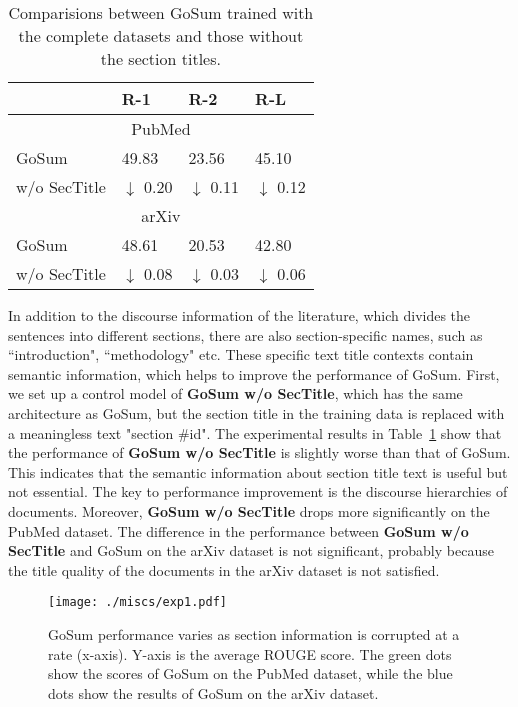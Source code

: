 \begin{table}[t]
  \centering
  \begin{tabular}{l|p{13mm}p{13mm}p{13mm}}\toprule
                    & \hfil R-1  & \hfil R-2  & \hfil R-L    \\ \midrule
                    \multicolumn{4}{c}{PubMed}     \\ \midrule
        GoSum                       & \hfil 49.83 & \hfil 23.56 & \hfil 45.10   \\
        \quad w/o SecTitle           & \hfil $\downarrow$ 0.20 & \hfil $\downarrow$ 0.11 & \hfil $\downarrow$ 0.12   \\ \midrule
                    \multicolumn{4}{c}{arXiv}     \\ \midrule
        GoSum                       & \hfil 48.61 & \hfil 20.53 & \hfil 42.80   \\
        \quad w/o SecTitle           & \hfil $\downarrow$ 0.08 & \hfil $\downarrow$ 0.03 & \hfil $\downarrow$ 0.06   \\ \bottomrule
  \end{tabular}
   \caption{Comparisions between GoSum trained with the complete datasets and those without the section titles.} \label{tab:exp2}
\end{table}
In addition to the discourse information of the literature, which divides the sentences into different sections, there are also section-specific names, such as ``introduction", ``methodology" etc.
These specific text title contexts contain semantic information, which helps to improve the performance of GoSum.
First, we set up a control model of \textbf{GoSum w/o SecTitle}, which has the same architecture as GoSum, but the section title in the training data is replaced with a meaningless text "section \#id".
The experimental results in Table~\ref{tab:exp2} show that the performance of  \textbf{GoSum w/o SecTitle} is slightly worse than that of GoSum. This indicates that the semantic information about section title text is useful but not essential. The key to performance improvement is the discourse hierarchies of documents.
Moreover, \textbf{GoSum w/o SecTitle} drops more significantly on the PubMed dataset. The difference in the performance between \textbf{GoSum w/o SecTitle}  and GoSum on the arXiv dataset is not significant, probably because the title quality of the documents in the arXiv dataset is not satisfied.

\begin{figure}[t]
    \centering
    \texttt{[image: ./miscs/exp1.pdf]} %
    \caption{GoSum performance varies as section information is corrupted at a rate (x-axis). Y-axis is the average ROUGE score. The green dots show the scores of GoSum on the PubMed dataset, while the blue dots show the results of GoSum on the arXiv dataset.}
    \label{fig:exp1}
\end{figure}

